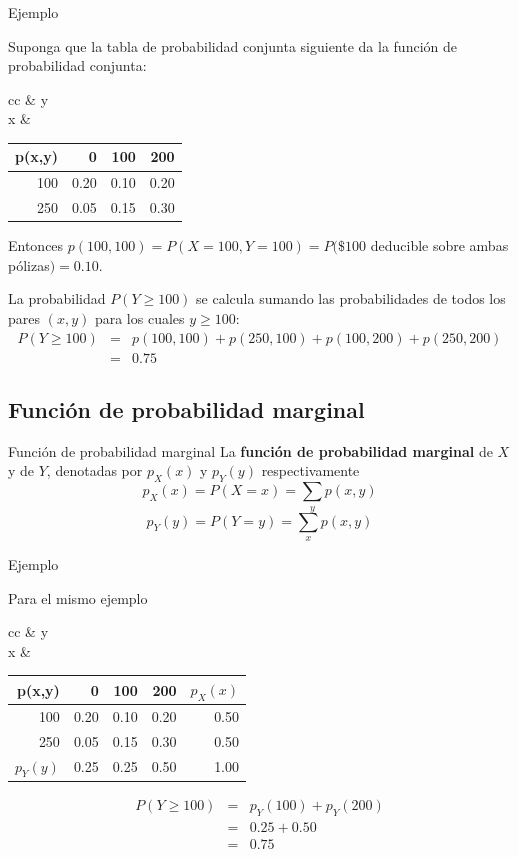 \documentclass[11pt]{beamer}
\begin{document}
\begin{frame}{Ejemplo}

Suponga que la tabla de probabilidad conjunta
siguiente da la función de probabilidad conjunta:
\begin{center}
\begin{tabular}{cc}
& y \\
x &
\begin{tabular}{r|rrr}
p(x,y) & 0 &  100 & 200 \\
\hline 
100 & 0.20 & 0.10 & 0.20 \\
250 & 0.05 & 0.15 & 0.30 
\end{tabular}
\end{tabular}
\end{center}
Entonces $p(100,100)=P(X=100,Y=100)=P(\$100$ deducible sobre ambas pólizas$)=0.10$.

La probabilidad $P(Y \ge 100)$ se calcula sumando las probabilidades de todos los pares $(x,y)$ para los cuales $y\ge100$:
\begin{eqnarray*}
P(Y \ge100)&=&p(100,100)+p(250,100)+p(100,200)+p(250,200) \\
&=& 0.75
\end{eqnarray*}
\end{frame}

\subsection{Función de probabilidad marginal}
\begin{frame}{Función de probabilidad marginal}
La {\bf función de probabilidad marginal} de $X$ y de $Y$, denotadas por $p_X (x)$  y $p_Y (y)$ respectivamente 
$$p_X(x)=P(X=x)=\sum_{y} p(x,y) $$ 
$$ p_Y(y)=P(Y=y)=\sum_{x} p(x,y)$$
\end{frame}


\begin{frame}{Ejemplo}

Para el mismo ejemplo
\begin{center}
\begin{tabular}{cc}
& y \\
x &
\begin{tabular}{r|rrr|r}
p(x,y) & 0 &  100 & 200 & $p_X(x)$ \\
\hline 
100 & 0.20 & 0.10 & 0.20  & 0.50 \\
250 & 0.05 & 0.15 & 0.30 & 0.50 \\
\hline
$p_Y(y)$ & 0.25 & 0.25 & 0.50 & 1.00
\end{tabular}
\end{tabular}
\end{center}


\begin{eqnarray*}
P(Y \ge100)&=&p_Y(100)+p_Y(200) \\
&=& 0.25+0.50\\
&=& 0.75
\end{eqnarray*}
\end{frame}
\end{document}

